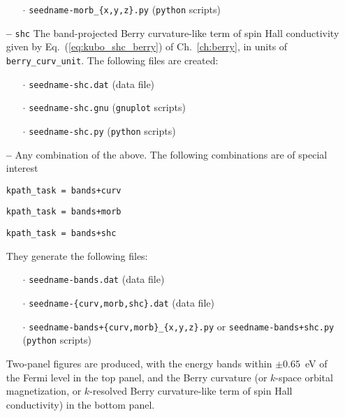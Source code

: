 \begin{itemize}
\begin{itemize}
   \item[$\cdot$] {\tt seedname-morb\_\{x,y,z\}.py} ({\tt python}
     scripts)

\end{itemize}

\item[{\bf --}] \verb#shc# The band-projected Berry curvature-like term of spin Hall conductivity given by
Eq.~(\ref{eq:kubo_shc_berry}) of Ch.~\ref{ch:berry}, in units of {\tt
	berry\_curv\_unit}. The following files are created:

\begin{itemize}
	
	\item[$\cdot$] {\tt seedname-shc.dat} (data file) 
	
	\item[$\cdot$] {\tt seedname-shc.gnu} ({\tt gnuplot} scripts)
	
	\item[$\cdot$] {\tt seedname-shc.py} ({\tt python} scripts)
	
\end{itemize}

\item[{\bf --}] Any combination of the above.  The following
  combinations are of special interest

{\tt kpath\_task = bands+curv}

{\tt kpath\_task = bands+morb}

{\tt kpath\_task = bands+shc}

They generate the following files:
\begin{itemize}
  
   \item[$\cdot$] {\tt seedname-bands.dat} (data file) 

   \item[$\cdot$] {\tt seedname-\{curv,morb,shc\}.dat} (data file) 

   \item[$\cdot$] {\tt seedname-bands+\{curv,morb\}\_\{x,y,z\}.py} or {\tt seedname-bands+shc.py}
     ({\tt python} scripts)

\end{itemize}

Two-panel figures are produced, with the energy bands within $\pm
0.65$~eV of the Fermi level in the top panel, and the Berry curvature
(or $k$-space orbital magnetization, or $k$-resolved Berry curvature-like term of spin Hall conductivity) in the bottom panel.
\end{itemize}

